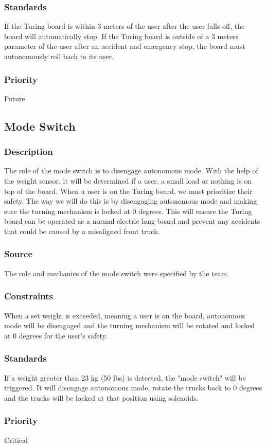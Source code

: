 \subsubsection{Standards}
If the Turing board is within 3 meters of the user after the user falls off, the board will automatically stop.\hfill \break
If the Turing board is outside of a 3 meters parameter of the user after an accident and emergency stop, the board must autonomously roll back to its user. 
\subsubsection{Priority}
Future

\subsection{Mode Switch}
\subsubsection{Description}
The role of the mode switch is to disengage autonomous mode. With the help of the weight sensor, it will be determined if a user, a small load or nothing is on top of the board. When a user is on the Turing board, we must prioritize their safety. The way we will do this is by disengaging autonomous mode and making sure the turning mechanism is locked at 0 degrees. This will ensure the Turing board can be operated as a normal electric long-board and prevent any accidents that could be caused by a misaligned front truck. 
\subsubsection{Source}
The role and mechanics of the mode switch were specified by the team.
\subsubsection{Constraints}
When a set weight is exceeded, meaning a user is on the board, autonomous mode will be disengaged and the turning mechanism will be rotated and locked at 0 degrees for the user's safety.
\subsubsection{Standards}
If a weight greater than 23 kg (50 lbs) is detected, the "mode switch" will be triggered. It will disengage autonomous mode, rotate the trucks back to 0 degrees and the trucks will be locked at that position using solenoids.
\subsubsection{Priority}
Critical
